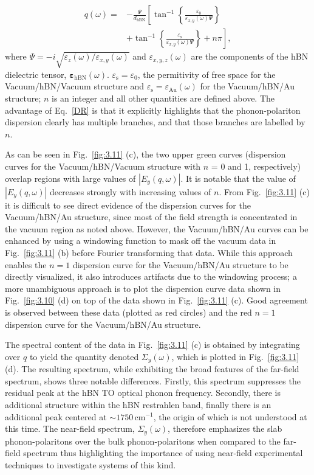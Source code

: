 \documentclass[preprint,
amsmath,amssymb,
aip,
jap,
floatfix,]{revtex4-2}
\begin{document}
				\begin{align}
				  q(\omega)   = & -  \frac{\Psi}{d_\mathrm{hBN}} \left[  
				    \tan^{-1} \left\{ \frac{\varepsilon_0}{\varepsilon_{x,y}(\omega)\Psi} \right\} \right. \nonumber\\
				     & +  \left. \tan^{-1} \left\{ \frac{\varepsilon_\mathrm{s}}{\varepsilon_{x,y}(\omega)\Psi} \right\} + n\pi \right],
				  \label{DR}
				\end{align}
				\noindent where $\Psi = -i\sqrt{\varepsilon_z(\omega)/\varepsilon_{x,y}(\omega)}$ and $\varepsilon_{x,y,z}(\omega)$ are the components of the hBN dielectric tensor, $\bm{\varepsilon}_\mathrm{hBN}(\omega)$. $\varepsilon_\mathrm{s} = \varepsilon_0$, the permitivity of free space for the Vacuum/hBN/Vacuum structure and $\varepsilon_\mathrm{s} = \varepsilon_\mathrm{Au}(\omega)$ for the Vacuum/hBN/Au structure; $n$ is an integer and all other quantities are defined above. The advantage of Eq.~\ref{DR} is that it explicitly highlights that the phonon-polariton dispersion clearly has multiple branches, and that those branches are labelled by $n$.

				As can be seen in Fig.~\ref{fig:3.11} (c), the two upper green curves (dispersion curves for the Vacuum/hBN/Vacuum structure with $n$ = 0 and 1, respectively) overlap regions with large values of $|E_y(q,\omega)|$. It is notable that the value of $|E_y(q,\omega)|$ decreases strongly with increasing values of $n$. From Fig.~\ref{fig:3.11} (c) it is difficult to see direct evidence of the dispersion curves for the Vacuum/hBN/Au structure, since most of the field strength is concentrated in the vacuum region as noted above. However, the Vacuum/hBN/Au curves can be enhanced by using a windowing function to mask off the vacuum data in Fig.~\ref{fig:3.11} (b) before Fourier transforming that data. While this approach enables the $n=1$ dispersion curve for the Vacuum/hBN/Au structure to be directly visualized, it also introduces artifacts due to the windowing process; a more unambiguous approach is to plot the dispersion curve data shown in Fig.~\ref{fig:3.10} (d) on top of the data shown in Fig.~\ref{fig:3.11} (c). Good agreement is observed between these data (plotted as red circles) and the red $n=1$ dispersion curve for the Vacuum/hBN/Au structure.

				The spectral content of the data in Fig.~\ref{fig:3.11} (c) is obtained by integrating over $q$ to yield the quantity denoted $\Sigma_y(\omega)$, which is plotted in Fig.~\ref{fig:3.11} (d). The resulting spectrum, while exhibiting the broad features of the far-field spectrum, shows three notable differences. Firstly, this spectrum suppresses the residual peak at the hBN TO optical phonon frequency. Secondly, there is additional structure within the hBN restrahlen band, finally there is an additional peak centered at $\sim 1750\, \mathrm{cm}^{-1}$, the origin of which is not understood at this time. The near-field spectrum, $\Sigma_y(\omega)$, therefore emphasizes the slab phonon-polaritons over the bulk phonon-polaritons when compared to the far-field spectrum thus highlighting the importance of using near-field experimental techniques to investigate systems of this kind. 
\end{document}
